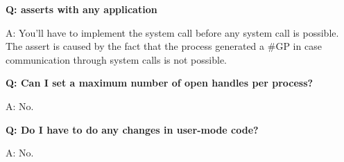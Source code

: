 \newline

\textbf{Q: \projectname asserts with any application}

A: You'll have to implement the  system call before any system call
is possible. The assert is caused by the fact that the process generated a \#GP in case communication
through system calls is not possible.

\newline

\textbf{Q: Can I set a maximum number of open handles per process?}

A: No.

\newline

\textbf{Q: Do I have to do any changes in user-mode code?}

A: No.